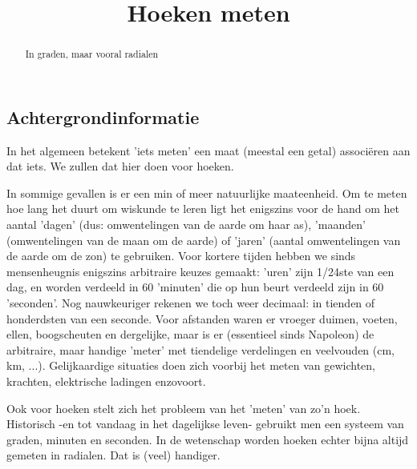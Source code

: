 \documentclass{ximera}
\title[Examples:]{Hoeken meten}
\begin{document}
\begin{abstract}
In graden, maar vooral radialen	
\end{abstract}
\maketitle


\subsection{Achtergrondinformatie}
	In het algemeen betekent 'iets meten' een maat (meestal een getal) associëren aan dat iets. We zullen dat hier doen voor hoeken.
\begin{expandable}
	In sommige gevallen is er een min of meer natuurlijke maateenheid. Om te meten hoe lang het duurt om wiskunde te leren ligt het enigszins voor de hand om het aantal 'dagen' (dus: omwentelingen van de aarde om haar as), 'maanden' (omwentelingen van de maan om de aarde) of 'jaren' (aantal omwentelingen van de aarde om de zon) te gebruiken. Voor kortere tijden hebben we sinds mensenheugnis enigszins arbitraire keuzes gemaakt: 'uren' zijn 1/24ste van een dag, en worden verdeeld in 60 'minuten' die op hun beurt verdeeld zijn in 60 'seconden'. Nog nauwkeuriger rekenen we toch weer decimaal: in tienden of honderdsten van een seconde. Voor afstanden waren er vroeger duimen, voeten, ellen, boogscheuten en dergelijke, maar is er (essentieel sinds Napoleon) de arbitraire, maar handige 'meter' met tiendelige verdelingen en veelvouden (cm, km, ...). Gelijkaardige situaties doen zich voorbij het meten van gewichten, krachten, elektrische ladingen enzovoort.

	Ook voor hoeken stelt zich het probleem van het 'meten' van zo'n hoek. Historisch -en tot vandaag in het dagelijkse leven- gebruikt men een systeem van graden, minuten en seconden. In de wetenschap worden hoeken echter bijna altijd gemeten in radialen. Dat is (veel) handiger.
\end{expandable}
\end{document}
